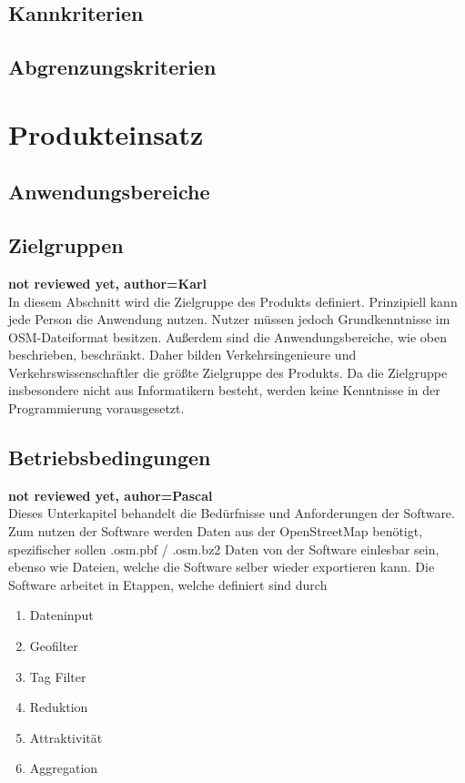 \documentclass[parskip=full]{scrartcl} %
\begin{document}
\subsection{Kannkriterien}
\subsection{Abgrenzungskriterien}
\newpage



\section{Produkteinsatz}

\subsection{Anwendungsbereiche}
\subsection{Zielgruppen}
\textbf{not reviewed yet, author=Karl\\}
In diesem Abschnitt wird die Zielgruppe des Produkts definiert. Prinzipiell kann jede Person die Anwendung nutzen. Nutzer müssen jedoch Grundkenntnisse im OSM-Dateiformat besitzen. Außerdem sind die Anwendungsbereiche, wie oben beschrieben, beschränkt. Daher bilden Verkehrsingenieure und Verkehrswissenschaftler die größte Zielgruppe des Produkts. Da die Zielgruppe insbesondere nicht aus Informatikern besteht, werden keine Kenntnisse in der Programmierung vorausgesetzt.

\subsection{Betriebsbedingungen}
\textbf{not reviewed yet, auhor=Pascal\\}
Dieses Unterkapitel behandelt die Bedürfnisse und Anforderungen der Software.
Zum nutzen der Software werden Daten aus der OpenStreetMap benötigt, spezifischer sollen .osm.pbf / .osm.bz2 Daten von der Software einlesbar sein, ebenso wie Dateien, welche die Software selber wieder exportieren kann.
Die Software arbeitet in Etappen, welche definiert sind durch
\begin{enumerate}
    \item Dateninput
    \item Geofilter
    \item Tag Filter
    \item Reduktion
    \item Attraktivität
    \item Aggregation
\end{enumerate}
\end{document}
